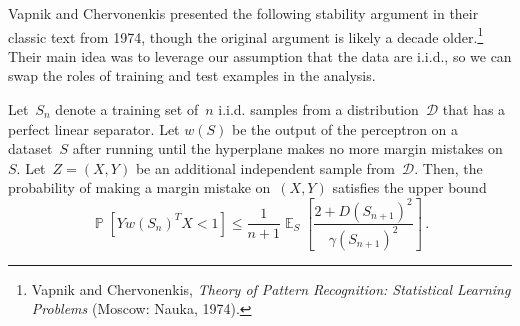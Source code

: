 \documentclass{tufte-book}
\begin{document}
Vapnik and Chervonenkis presented the following stability argument in
their classic text from 1974, though the original argument is likely a
decade older.\footnote{Vapnik and Chervonenkis, \emph{Theory of Pattern
  Recognition: Statistical Learning Problems} (Moscow: Nauka, 1974).}
Their main idea was to leverage our assumption that the data are i.i.d.,
so we can swap the roles of training and test examples in the analysis.

\begin{Theorem}

Let~\(S_n\) denote a training set of~\(n\) i.i.d. samples from a
distribution~\(\mathcal{D}\) that has a perfect linear separator. Let
\(w(S)\) be the output of the perceptron on a dataset~\(S\) after
running until the hyperplane makes no more margin mistakes on~\(S\).
Let~\(Z=(X,Y)\) be an additional independent sample
from~\(\mathcal{D}\). Then, the probability of making a margin mistake
on~\((X,Y)\) satisfies the upper bound \[
    \mathop\mathbb{P}[Y w(S_n)^T X < 1] \leq \frac{1}{n+1} {\mathop\mathbb{E}}_S\left[ \frac{2+D(S_{n+1})^2}{\gamma(S_{n+1})^2} \right]\,.
\]

\end{Theorem}
\end{document}
